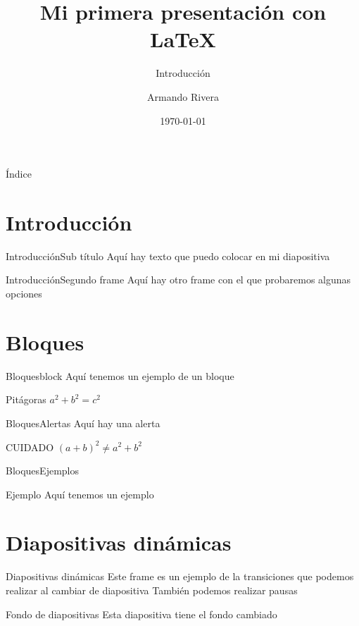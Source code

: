 \documentclass{beamer}
\author{Armando Rivera}
\date{\today}
\title{Mi primera presentación con \LaTeX}
\subtitle{Introducción}
\institute[UNAM]{Universidad Nacional Autónoma de México\\Facultad de Ingenieía}
\begin{document}
	\begin{frame}
		\maketitle	
	\end{frame}
	\begin{frame}{Índice}
	\tableofcontents
	\end{frame}
	\section{Introducción}
	
	\begin{frame}{Introducción}{Sub título}
		Aquí hay texto que puedo colocar en mi diapositiva
	\end{frame}

	\begin{frame}{Introducción}{Segundo frame}
		Aquí hay otro frame con el que probaremos algunas opciones
	\end{frame}
\section{Bloques}
	\begin{frame}{Bloques}{block}
	Aquí tenemos un ejemplo de un bloque
	\begin{block}{Pitágoras}
			$ a^2+b^2=c^2 $
	\end{block}		
	\end{frame}
	\begin{frame}{Bloques}{Alertas}
	Aquí hay una alerta
	\begin{alertblock}{CUIDADO}
		$ (a+b)^2\neq a^2+b^2 $
	\end{alertblock}
	\end{frame}
	\begin{frame}{Bloques}{Ejemplos}
		\begin{exampleblock}{Ejemplo}
			Aquí tenemos un ejemplo
		\end{exampleblock}
	\end{frame}
	\section{Diapositivas dinámicas}
	\begin{frame}{Diapositivas dinámicas}
		\transsplitverticalout
		Este frame es un ejemplo de la transiciones que podemos realizar al cambiar de diapositiva\pause
		También podemos realizar pausas
	\end{frame}
	{
			
			\usebackgroundtemplate{
				\texttt{[image: img/fondo]}
			}
			\begin{frame}{Fondo de diapositivas}
			Esta diapositiva tiene el fondo cambiado
		\end{frame}
	}
	
\end{document}
